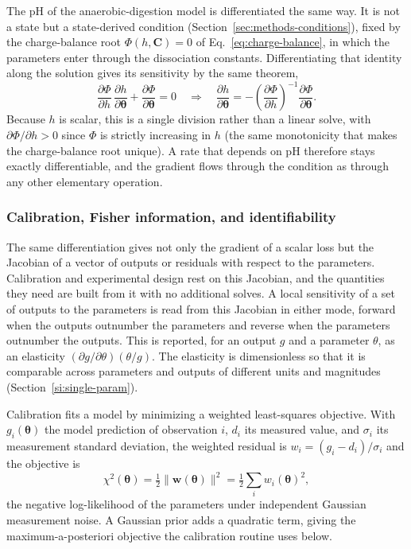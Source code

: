 \documentclass{article}
\begin{document}
The pH of the anaerobic-digestion model is differentiated the same way. It is not a state but a state-derived condition (Section~\ref{sec:methods-conditions}), fixed by the charge-balance root \(\Phi(h,\mathbf{C})=0\) of Eq.~\eqref{eq:charge-balance}, in which the parameters enter through the dissociation constants. Differentiating that identity along the solution gives its sensitivity by the same theorem,
\begin{equation}
  \frac{\partial\Phi}{\partial h}\,\frac{\partial h}{\partial\boldsymbol{\theta}}
    + \frac{\partial\Phi}{\partial\boldsymbol{\theta}} = 0
    \quad\Longrightarrow\quad
  \frac{\partial h}{\partial\boldsymbol{\theta}}
   = -\left(\frac{\partial\Phi}{\partial h}\right)^{-1}\frac{\partial\Phi}{\partial\boldsymbol{\theta}}.
  \label{eq:ph-ift}
\end{equation}
Because \(h\) is scalar, this is a single division rather than a linear solve, with \(\partial\Phi/\partial h>0\) since \(\Phi\) is strictly increasing in \(h\) (the same monotonicity that makes the charge-balance root unique). A rate that depends on pH therefore stays exactly differentiable, and the gradient flows through the condition as through any other elementary operation.

\subsubsection{Calibration, Fisher information, and identifiability}

The same differentiation gives not only the gradient of a scalar loss but the Jacobian of a vector of outputs or residuals with respect to the parameters. Calibration and experimental design rest on this Jacobian, and the quantities they need are built from it with no additional solves. A local sensitivity of a set of outputs to the parameters is read from this Jacobian in either mode, forward when the outputs outnumber the parameters and reverse when the parameters outnumber the outputs. This is reported, for an output \(g\) and a parameter \(\theta\), as an elasticity \((\partial g/\partial\theta)(\theta/g)\). The elasticity is dimensionless so that it is comparable across parameters and outputs of different units and magnitudes (Section~\ref{si:single-param}).

Calibration fits a model by minimizing a weighted least-squares objective. With \(g_i(\boldsymbol{\theta})\) the model prediction of observation \(i\), \(d_i\) its measured value, and \(\sigma_i\) its measurement standard deviation, the weighted residual is \(w_i=(g_i-d_i)/\sigma_i\) and the objective is
\begin{equation}
  \chi^2(\boldsymbol{\theta})=\tfrac12\lVert\mathbf{w}(\boldsymbol{\theta})\rVert^2=\tfrac12\sum_i w_i(\boldsymbol{\theta})^2 ,
  \label{eq:wls}
\end{equation}
the negative log-likelihood of the parameters under independent Gaussian measurement noise. A Gaussian prior adds a quadratic term, giving the maximum-a-posteriori objective the calibration routine uses below.
\end{document}
